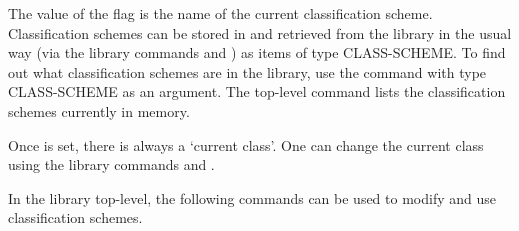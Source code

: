 The value of the flag  is the name of
the current classification scheme.  Classification schemes
can be stored in and retrieved from the library in the usual
way (via the library commands  and )
as items of type CLASS-SCHEME.
To find out what classification schemes are in the library,
use the command  with type CLASS-SCHEME
as an argument.
The top-level command  lists the classification
schemes currently in memory.

Once  is set, there is always a
`current class'.  One can change the current class using
the library commands  and .

In the library top-level, the following commands can be used
to modify and use classification schemes.

